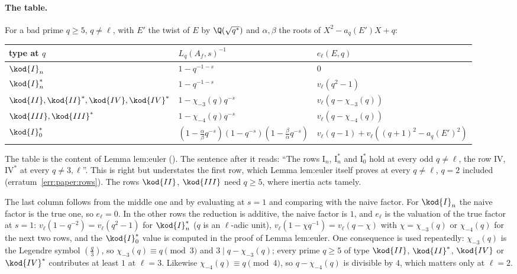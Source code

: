 \begin{sloppypar}
\paragraph{The table.} For a bad prime $q\ge5$, $q\ne\ell$, with $E'$ the twist of $E$ by $\Q(\sqrt{q^*})$ and $\alpha,\beta$ the roots of $X^2-a_q(E')X+q$:
\begin{center}\small
\begin{tabular}{lll}
\toprule
type at $q$ & $L_q(A_f,s)^{-1}$ & $e_\ell(E,q)$\\
\midrule
$\kod{I}_n$ & $1-q^{-1-s}$ & $0$\\
$\kod{I}_n^*$ & $1-q^{-1-s}$ & $v_\ell(q^2-1)$\\
$\kod{II},\kod{II}^*,\kod{IV},\kod{IV}^*$ & $1-\chi_{-3}(q)q^{-s}$ & $v_\ell(q-\chi_{-3}(q))$\\
$\kod{III},\kod{III}^*$ & $1-\chi_{-4}(q)q^{-s}$ & $v_\ell(q-\chi_{-4}(q))$\\
$\kod{I}_0^*$ & $(1-\frac\alpha\beta q^{-s})(1-q^{-s})(1-\frac\beta\alpha q^{-s})$ & $v_\ell(q-1)+v_\ell((q+1)^2-a_q(E')^2)$\\
\bottomrule
\end{tabular}
\end{center}
The table is the content of Lemma lem:euler (). The sentence after it reads: ``The rows $\mathrm{I}_n$, $\mathrm{I}_n^*$ and $\mathrm{I}_0^*$ hold at every
odd $q\ne\ell$, the row $\mathrm{IV}$, $\mathrm{IV}^*$ at every $q\ne3,\ell$''. This is right but understates the first row, which Lemma lem:euler itself proves at every
$q\ne\ell$, $q=2$ included (erratum~\ref{err:paper:rows}). The rows $\kod{II}$, $\kod{III}$ need $q\ge5$, where inertia acts tamely.

The last column follows from the middle one and  by evaluating at $s=1$ and comparing with the naive factor. For $\kod{I}_n$ the naive factor is the
true one, so $e_\ell=0$. In the other rows the reduction is additive, the naive factor is $1$, and $e_\ell$ is the valuation of the true factor at $s=1$: $v_\ell(1-q^{-2})=v_\ell(q^2-1)$
for $\kod{I}_n^*$ ($q$ is an $\ell$-adic unit), $v_\ell(1-\chi q^{-1})=v_\ell(q-\chi)$ with $\chi=\chi_{-3}(q)$ or $\chi_{-4}(q)$ for the next two rows, and the $\kod{I}_0^*$ value is computed in the proof of
Lemma lem:euler. One consequence is used repeatedly: $\chi_{-3}(q)$ is the Legendre symbol $(\frac q3)$, so $\chi_{-3}(q)\equiv q\pmod3$ and $3\mid q-\chi_{-3}(q)$; every prime $q\ge5$ of type $\kod{II}$,
$\kod{II}^*$, $\kod{IV}$ or $\kod{IV}^*$ contributes at least $1$ at $\ell=3$. Likewise $\chi_{-4}(q)\equiv q\pmod4$, so $q-\chi_{-4}(q)$ is divisible by $4$, which matters only at $\ell=2$.


\end{sloppypar}
